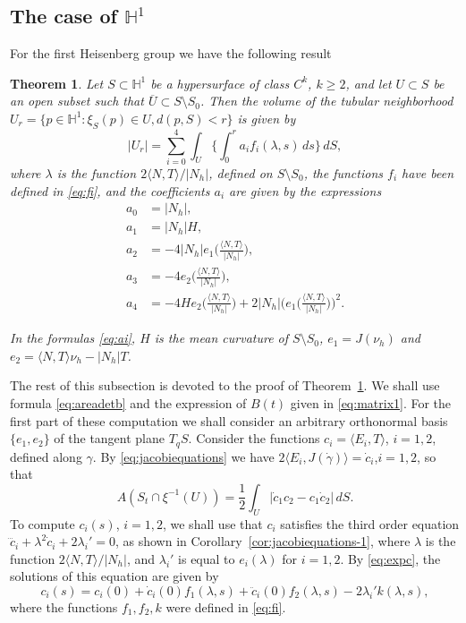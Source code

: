 \documentclass[10pt]{amsart}
\newtheorem{theorem}{Theorem}[section]
\theoremstyle{definition}
\theoremstyle{remark}
\numberwithin{equation}{section}
\begin{document}
\subsection{The case of ${{\mathbb{H}}}^1$}

For the first Heisenberg group we have the following result

\begin{theorem}
\label{thm:steiner1}
Let $S\subset{{\mathbb{H}}}^1$ be a hypersurface of class $C^k$, $k{\geqslant} 2$, and let $U\subset S$ be an open subset such that $\overline{U}\subset S\setminus S_0$. Then the volume of the tubular neighborhood $U_r=\{p\in{{\mathbb{H}}}^1:\xi_S(p)\in U, d(p,S)<r\}$ is given by
\begin{equation}
\label{eq:tub1}
|U_r|= \sum_{i=0}^4\int_U\bigg\{\int_0^r a_i f_i({\lambda}, s)\,ds\bigg\}\,dS,
\end{equation}
where ${\lambda}$ is the function $2{\langle{N,T}\rangle}/|N_h|$, defined on $S\setminus S_0$, the functions $f_i$ have been defined in \eqref{eq:fi}, and the  coefficients $a_i$ are given by the expressions
\begin{equation}
\label{eq:ai}
\begin{split}
a_{0}&=|N_{h}|,
\\
a_{1}&=|N_h| H,
\\
a_{2}&=-4|N_h|e_1\bigg({\frac{{\langle{N,T}\rangle}}{|N_h|}}\bigg),
\\
a_{3}&=-4e_2\bigg({\frac{{\langle{N,T}\rangle}}{|N_h|}}\bigg),
\\
a_{4}&=-4He_2\bigg({\frac{{\langle{N,T}\rangle}}{|N_h|}}\bigg)+2|N_h|\bigg(e_1\bigg({\frac{{\langle{N,T}\rangle}}{|N_h|}}\bigg)\bigg)^2.
\end{split}
\end{equation}

In the formulas \eqref{eq:ai}, $H$ is the mean curvature of $S\setminus S_0$, $e_1=J({\nu_{h}})$ and $e_2={\langle{N,T}\rangle}{\nu_{h}}-{|N_{h}|} T$.
\end{theorem}

The rest of this subsection is devoted to the proof of Theorem~\ref{thm:steiner1}. We shall use formula \eqref{eq:areadetb} and the expression of $B(t)$ given in \eqref{eq:matrix1}. For the first part of these computation we shall consider an arbitrary orthonormal basis $\{e_1,e_2\}$ of the tangent plane $T_qS$. Consider the functions $c_i={\langle{E_i,T}\rangle}$, $i=1,2$, defined along ${\gamma}$. By \eqref{eq:jacobiequations} we have $2{\langle{E_i,J({\dot{\gamma}})}\rangle}=\dot{c}_i$,$i=1,2$, so that
\[
A(S_t\cap\xi^{-1}(U))=\frac{1}{2}\int_U |\dot{c}_1c_2-c_1\dot{c}_2|\, dS.
\]
To compute $c_{i}(s)$, $i=1,2$, we shall use that $c_{i}$ satisfies the third order equation $\dddot{c}_{i}+{\lambda}^2\dot{c}_{i}+2{\lambda}_{i}'=0$, as shown in Corollary~\ref{cor:jacobiequations-1}, where ${\lambda}$ is the function $2{\langle{N,T}\rangle}/|N_{h}|$, and ${\lambda}_{i}'$ is equal to $e_{i}({\lambda})$ for $i=1,2$. By \eqref{eq:expc}, the solutions of this equation are given by
\[
c_i(s)=c_i(0)+\dot{c}_i(0)f_1({\lambda}, s)+\ddot{c}_i(0)f_2({\lambda}, s)-2{\lambda}_i'k({\lambda}, s),
\]
where the functions $f_1, f_2, k$ were defined in \eqref{eq:fi}. 
\end{document}
